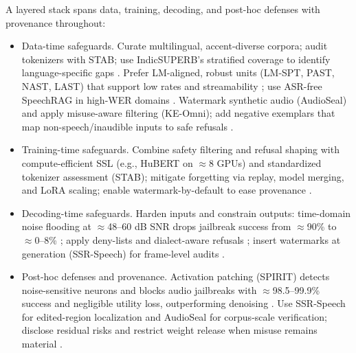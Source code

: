 \documentclass{article}
\begin{document}
A layered stack spans data, training, decoding, and post-hoc defenses with provenance throughout:
\begin{itemize}
\item Data-time safeguards. Curate multilingual, accent-diverse corpora; audit tokenizers with STAB; use IndicSUPERB's stratified coverage to identify language-specific gaps \cite{vashishth2024stabspeechtokenizerassessmentbenchmark,entry2025indicsuperbspeechprocessinguniversalperf}. Prefer LM-aligned, robust units (LM-SPT, PAST, NAST, LAST) that support low rates and streamability \cite{jo2025lmsptalignedsemanticdistillationspeechto,har-tuv2025pastphoneticacousticspeechtokenizer,messica2024nastnoiseawarespeechtokenizationlanguage,turetzky2024lastlanguagemodelawarespeechtokenization}; use ASR-free SpeechRAG in high-WER domains \cite{min2025speechretrievalaugmentedgenerationwithou}. Watermark synthetic audio (AudioSeal) and apply misuse-aware filtering (KE-Omni); add negative exemplars that map non-speech/inaudible inputs to safe refusals \cite{zhao2024advancingspeechlanguagemodelsscalingsupe,dao2025ichigomixedmodalearlyfusionrealtimevoice}.
\item Training-time safeguards. Combine safety filtering and refusal shaping with compute-efficient SSL (e.g., HuBERT on $\approx$8 GPUs) and standardized tokenizer assessment (STAB); mitigate forgetting via replay, model merging, and LoRA scaling; enable watermark-by-default to ease provenance \cite{chen2023reducingbarriersselfsupervisedlearninghu,vashishth2024stabspeechtokenizerassessmentbenchmark,hsiao2025analyzingmitigationstrategiescatastrophi,wang2025ssrspeechtowardsstablesaferobustzeroshot,zhu2024generativepretrainedspeechlanguagemodele}.
\item Decoding-time safeguards. Harden inputs and constrain outputs: time-domain noise flooding at $\approx$48--60 dB SNR drops jailbreak success from $\approx$90\% to $\approx$0--8\% \cite{peri2024speechguardexploringadversarialrobustnes}; apply deny-lists and dialect-aware refusals \cite{dao2025ichigomixedmodalearlyfusionrealtimevoice}; insert watermarks at generation (SSR-Speech) for frame-level audits \cite{wang2025ssrspeechtowardsstablesaferobustzeroshot}.
\item Post-hoc defenses and provenance. Activation patching (SPIRIT) detects noise-sensitive neurons and blocks audio jailbreaks with $\approx$98.5--99.9\% success and negligible utility loss, outperforming denoising \cite{djanibekov2025spiritpatchingspeechlanguagemodelsagains}. Use SSR-Speech for edited-region localization and AudioSeal for corpus-scale verification; disclose residual risks and restrict weight release when misuse remains material \cite{wang2025ssrspeechtowardsstablesaferobustzeroshot,zhao2024advancingspeechlanguagemodelsscalingsupe,park2025longformspeechgenerationspokenlanguagemo}.
\end{itemize}
\end{document}

